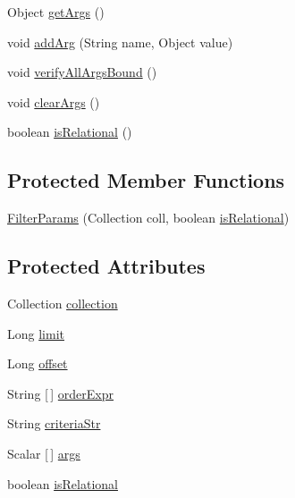 \begin{DoxyCompactItemize}
\item 
Object \mbox{\hyperlink{classcom_1_1mysql_1_1cj_1_1xdevapi_1_1_filter_params_a271d4ea9712402151234e5572a6aa09b}{get\+Args}} ()
\item 
void \mbox{\hyperlink{classcom_1_1mysql_1_1cj_1_1xdevapi_1_1_filter_params_a14711ecd2e838e02df5d7ec3fbb530bc}{add\+Arg}} (String name, Object value)
\item 
void \mbox{\hyperlink{classcom_1_1mysql_1_1cj_1_1xdevapi_1_1_filter_params_a404c1357e69a9ae03bcc221bed29701e}{verify\+All\+Args\+Bound}} ()
\item 
void \mbox{\hyperlink{classcom_1_1mysql_1_1cj_1_1xdevapi_1_1_filter_params_a44893f6e83b75a7251db6fd6e6e6354a}{clear\+Args}} ()
\item 
boolean \mbox{\hyperlink{classcom_1_1mysql_1_1cj_1_1xdevapi_1_1_filter_params_a6138eacef0c1d882b002d26ad5e84978}{is\+Relational}} ()
\end{DoxyCompactItemize}
\subsection*{Protected Member Functions}
\begin{DoxyCompactItemize}
\item 
\mbox{\hyperlink{classcom_1_1mysql_1_1cj_1_1xdevapi_1_1_filter_params_a6408bc660a0f6eb4e982444537c9130e}{Filter\+Params}} (Collection coll, boolean \mbox{\hyperlink{classcom_1_1mysql_1_1cj_1_1xdevapi_1_1_filter_params_a0224c120aec3648050bdf39abf891859}{is\+Relational}})
\end{DoxyCompactItemize}
\subsection*{Protected Attributes}
\begin{DoxyCompactItemize}
\item 
Collection \mbox{\hyperlink{classcom_1_1mysql_1_1cj_1_1xdevapi_1_1_filter_params_a0ba12631f4aaf432f4be6cf9246aa280}{collection}}
\item 
Long \mbox{\hyperlink{classcom_1_1mysql_1_1cj_1_1xdevapi_1_1_filter_params_a280a8838cf2cf03e4263cafc7594c51f}{limit}}
\item 
Long \mbox{\hyperlink{classcom_1_1mysql_1_1cj_1_1xdevapi_1_1_filter_params_ae5a7ad2d85c2332b4969cc3470c01352}{offset}}
\item 
String \mbox{[}$\,$\mbox{]} \mbox{\hyperlink{classcom_1_1mysql_1_1cj_1_1xdevapi_1_1_filter_params_acd0942ec1171fe30668e7d5369a691dd}{order\+Expr}}
\item 
String \mbox{\hyperlink{classcom_1_1mysql_1_1cj_1_1xdevapi_1_1_filter_params_a37d7c36702c7f5e81caa9f5ca69999e1}{criteria\+Str}}
\item 
Scalar \mbox{[}$\,$\mbox{]} \mbox{\hyperlink{classcom_1_1mysql_1_1cj_1_1xdevapi_1_1_filter_params_ae3adbf0806de4ffec65279e403a9473f}{args}}
\item 
boolean \mbox{\hyperlink{classcom_1_1mysql_1_1cj_1_1xdevapi_1_1_filter_params_a0224c120aec3648050bdf39abf891859}{is\+Relational}}
\end{DoxyCompactItemize}


